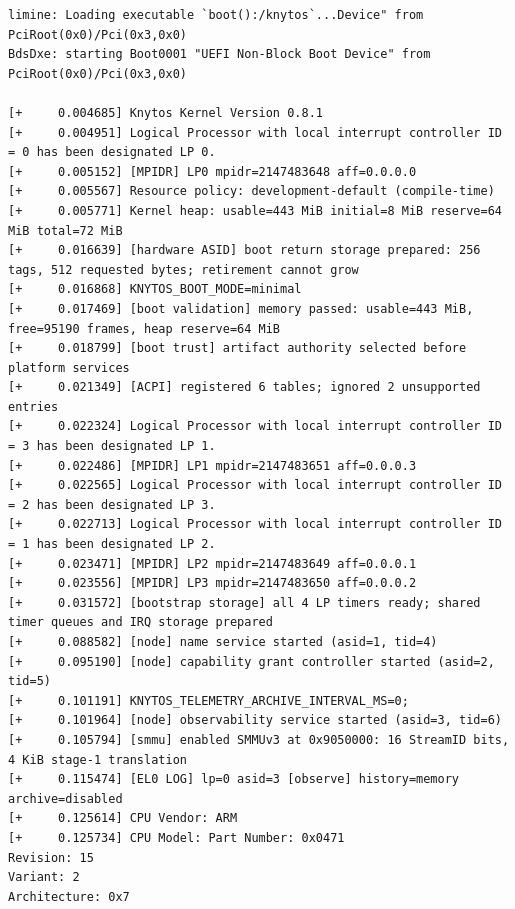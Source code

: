 \begin{verbatim}
limine: Loading executable `boot():/knytos`...Device" from PciRoot(0x0)/Pci(0x3,0x0)
BdsDxe: starting Boot0001 "UEFI Non-Block Boot Device" from PciRoot(0x0)/Pci(0x3,0x0)

[+     0.004685] Knytos Kernel Version 0.8.1
[+     0.004951] Logical Processor with local interrupt controller ID = 0 has been designated LP 0.
[+     0.005152] [MPIDR] LP0 mpidr=2147483648 aff=0.0.0.0
[+     0.005567] Resource policy: development-default (compile-time)
[+     0.005771] Kernel heap: usable=443 MiB initial=8 MiB reserve=64 MiB total=72 MiB
[+     0.016639] [hardware ASID] boot return storage prepared: 256 tags, 512 requested bytes; retirement cannot grow
[+     0.016868] KNYTOS_BOOT_MODE=minimal
[+     0.017469] [boot validation] memory passed: usable=443 MiB, free=95190 frames, heap reserve=64 MiB
[+     0.018799] [boot trust] artifact authority selected before platform services
[+     0.021349] [ACPI] registered 6 tables; ignored 2 unsupported entries
[+     0.022324] Logical Processor with local interrupt controller ID = 3 has been designated LP 1.
[+     0.022486] [MPIDR] LP1 mpidr=2147483651 aff=0.0.0.3
[+     0.022565] Logical Processor with local interrupt controller ID = 2 has been designated LP 3.
[+     0.022713] Logical Processor with local interrupt controller ID = 1 has been designated LP 2.
[+     0.023471] [MPIDR] LP2 mpidr=2147483649 aff=0.0.0.1
[+     0.023556] [MPIDR] LP3 mpidr=2147483650 aff=0.0.0.2
[+     0.031572] [bootstrap storage] all 4 LP timers ready; shared timer queues and IRQ storage prepared
[+     0.088582] [node] name service started (asid=1, tid=4)
[+     0.095190] [node] capability grant controller started (asid=2, tid=5)
[+     0.101191] KNYTOS_TELEMETRY_ARCHIVE_INTERVAL_MS=0;
[+     0.101964] [node] observability service started (asid=3, tid=6)
[+     0.105794] [smmu] enabled SMMUv3 at 0x9050000: 16 StreamID bits, 4 KiB stage-1 translation
[+     0.115474] [EL0 LOG] lp=0 asid=3 [observe] history=memory archive=disabled
[+     0.125614] CPU Vendor: ARM
[+     0.125734] CPU Model: Part Number: 0x0471
Revision: 15
Variant: 2
Architecture: 0x7


\end{verbatim}
